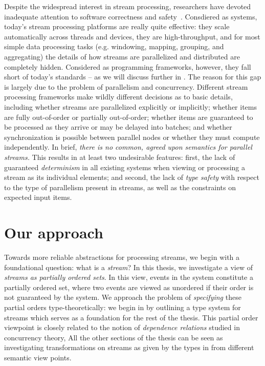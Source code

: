 Despite the widespread interest in stream processing, researchers have devoted inadequate attention to software correctness and safety~.
Consdiered as systems, today's stream processing platforms are really quite effective: they scale automatically across threads and devices, they are high-throughput, and for most simple data processing tasks (e.g. windowing, mapping, grouping, and aggregating) the details of how streams are parallelized and distributed are completely hidden. Considered as programming frameworks, however, they fall short of today's standards -- as we will discuss further in . The reason for this gap is largely due to the problem of parallelism and concurrency. Different stream processing frameworks make wildly different decisions as to basic details, including whether streams are parallelized explicitly or implicitly; whether items are fully out-of-order or partially out-of-order; whether items are guaranteed to be processed as they arrive or may be delayed into batches; and whether synchronization is possible between parallel nodes or whether they must compute independently.
In brief, \emph{there is no common, agreed upon semantics for parallel streams.}
This results in at least two undesirable features: first, the lack of guaranteed \emph{determinism} in all existing systems when viewing or processing a stream as its individual elements; and second, the lack of \emph{type safety} with respect to the type of parallelism present in streams, as well as the constraints on expected input items.

\section{Our approach}

Towards more reliable abstractions for processing streams, we begin with a foundational question: what is a \emph{stream}?
In this thesis, we investigate a view of \emph{streams as partially ordered sets}.
In this view, events in the system constitute a partially ordered set,
where two events are viewed as unordered if their order
is not guaranteed by the system.
We approach the problem of \emph{specifying} these partial orders type-theoretically: we begin in  by
outlining a type system for streams which serves as a foundation for the rest of the thesis.
This partial order viewpoint is closely related to the notion of \emph{dependence relations} studied in concurrency theory,
All the other sections of the thesis can be seen as investigating transformations on streams as given by the types in  from different semantic view points.

